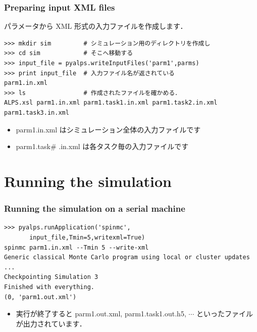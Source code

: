
\begin{frame}[t,fragile]
\frametitle{Preparing input XML files}
パラメータから XML 形式の入力ファイルを作成します．
\begin{lstlisting}
>>> mkdir sim         # シミュレーション用のディレクトリを作成し
>>> cd sim            # そこへ移動する
>>> input_file = pyalps.writeInputFiles('parm1',parms)
>>> print input_file  # 入力ファイル名が返されている
parm1.in.xml
>>> ls                # 作成されたファイルを確かめる．
ALPS.xsl parm1.in.xml parm1.task1.in.xml parm1.task2.in.xml parm1.task3.in.xml
\end{lstlisting}
\begin{itemize}
 \item parm1.in.xml はシミュレーション全体の入力ファイルです
 \item parm1.task\# .in.xml は各タスク毎の入力ファイルです
\end{itemize}

\end{frame}

\section{Running the simulation}
\begin{frame}[t,fragile]
\frametitle{Running the simulation on a serial machine}
\begin{lstlisting}
>>> pyalps.runApplication('spinmc',
       input_file,Tmin=5,writexml=True)
spinmc parm1.in.xml --Tmin 5 --write-xml
Generic classical Monte Carlo program using local or cluster updates
...
Checkpointing Simulation 3
Finished with everything.
(0, 'parm1.out.xml')
\end{lstlisting}
\begin{itemize}
\item 実行が終了すると parm1.out.xml, parm1.task1.out.h5, $\cdots$ といったファイルが出力されています．
\end{itemize}
 
\end{frame}

